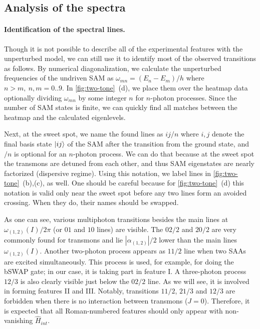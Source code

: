 \documentclass[%
 pra,
 amsmath,amssymb,
 reprint,%
]{revtex4-1}
\begin{document}
\subsection{Analysis of the spectra} 
\label{sec:analysis}

\paragraph{Identification of the spectral lines.} 
Though it is not possible to describe all of the 
experimental features with the unperturbed model, 
we can still use it to identify most of the 
observed transitions as follows. By numerical diagonalization, we calculate the 
unperturbed frequencies of the undriven SAM as 
$\omega_{mn} = (E_n - E_m)/h$ where $n>m,\  
n,m=0..9$. In \autoref{fig:two-tone}~(d), we 
place them over the heatmap data optionally dividing 
$\omega_{mn}$ by some integer $n$ for $n$-photon processes. 
Since the number of SAM states is finite, we can 
quickly find all matches between the heatmap and the calculated eigenlevels. 

Next, at the sweet spot, we name the found lines 
as $ij/n$ where $i,j$ denote the final basis 
state $\ket{ij}$ of the SAM after the transition 
from the ground state, and $/n$ is optional for 
an $n$-photon process. We can do that because at 
the sweet spot the transmons are detuned from 
each other, and thus SAM eigenstates are nearly 
factorized (dispersive regime). Using this 
notation, we label lines in 
\autoref{fig:two-tone}~(b),(c), as well. One 
should be careful because for 
\autoref{fig:two-tone}~(d) this notation is valid 
only near the sweet spot before any two lines 
form an avoided crossing. When they do, their 
names should be swapped.
 
As one can see, various multiphoton transitions besides 
the main lines at $\omega_{(1,2)}(I)/2\pi$ (or 
$01$ and $10$ lines) are visible. The ${02/2}$ and ${20/2}$ 
are very commonly found for transmons and lie 
$|\alpha_{(1,2)}|/2$ lower than the main lines 
$\omega_{(1,2)}(I)$. Another two-photon process 
appears as $11/2$ line when two SAAs are excited 
simultaneously. This process is used, for 
example, for doing the bSWAP 
gate\cite{poletto2012entanglement}; in our case, 
it is taking part in feature I. A 
three-photon process $12/3$ is also clearly 
visible just below the $02/2$ line. As we will 
see, it is involved in forming features II and 
III. Notably, transitions $11/2$, ${21/3}$ and 
${12/3}$ are forbidden when there is no 
interaction between transmons ($J=0$). Therefore, 
it is expected that all Roman-numbered features 
should only appear with non-vanishing $\hat 
H_{int}$.
\end{document}

